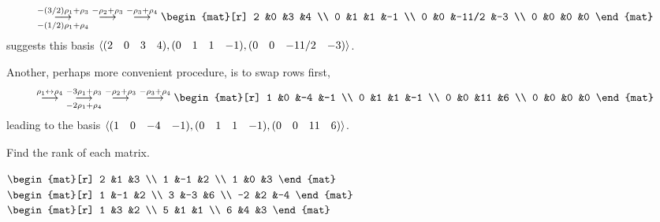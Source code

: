 \begin{exercises}
\begin{answer}
\begin{equation*}
       \grstep[-(1/2)\rho_1+\rho_4]{-(3/2)\rho_1+\rho_3}
       \;\grstep{-\rho_2+\rho_3}
       \;\grstep{-\rho_3+\rho_4}
       \begin{mat}[r]
         2  &0  &3      &4   \\
         0  &1  &1      &-1 \\
         0  &0  &-11/2  &-3  \\
         0  &0  &0      &0
       \end{mat}
     \end{equation*}
     suggests this basis
     $\langle(\begin{matrix} 2 &0 &3 &4 \end{matrix}),
         (\begin{matrix} 0 &1 &1 &-1 \end{matrix}),(\begin{matrix} 0 &0 &-11/2 &-3 \end{matrix})\rangle$.

      Another, perhaps more convenient procedure, is to swap rows first,
      \begin{equation*}
        \grstep{\rho_1\swap\rho_4}
        \;\grstep[-2\rho_1+\rho_4]{-3\rho_1+\rho_3}
        \;\grstep{-\rho_2+\rho_3}
        \;\grstep{-\rho_3+\rho_4}
        \begin{mat}[r]
           1  &0  &-4 &-1 \\
           0  &1  &1  &-1 \\
           0  &0  &11 &6  \\
           0  &0  &0  &0
         \end{mat}
      \end{equation*}
      leading to the basis
      \( \langle(\begin{matrix} 1 &0 &-4 &-1 \end{matrix}),(\begin{matrix} 0 &1 &1 &-1 \end{matrix}),
                   (\begin{matrix} 0 &0 &11 &6 \end{matrix})\rangle \).  
    \end{answer}
  \recommended \item 
    Find the rank of each matrix.
    \begin{exparts*}
      \partsitem \(
        \begin{mat}[r]
          2  &1  &3  \\
          1  &-1 &2  \\
          1  &0  &3
        \end{mat}  \)
      \partsitem \(
        \begin{mat}[r]
          1  &-1 &2  \\
          3  &-3 &6  \\
         -2  &2  &-4
        \end{mat}  \)
      \partsitem \(
        \begin{mat}[r]
          1  &3  &2  \\
          5  &1  &1  \\
          6  &4  &3
        \end{mat}  \)

\end{exparts*}
\end{exercises}
